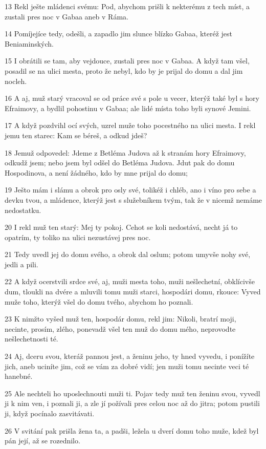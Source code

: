 \par 13 Rekl ješte mládenci svému: Pod, abychom prišli k nekterému z tech míst, a zustali pres noc v Gabaa aneb v Ráma.
\par 14 Pomíjejíce tedy, odešli, a zapadlo jim slunce blízko Gabaa, kteréž jest Beniaminských.
\par 15 I obrátili se tam, aby vejdouce, zustali pres noc v Gabaa. A když tam všel, posadil se na ulici mesta, proto že nebyl, kdo by je prijal do domu a dal jim nocleh.
\par 16 A aj, muž starý vracoval se od práce své s pole u vecer, kterýž také byl s hory Efraimovy, a bydlil pohostinu v Gabaa; ale lidé místa toho byli synové Jemini.
\par 17 A když pozdvihl ocí svých, uzrel muže toho pocestného na ulici mesta. I rekl jemu ten starec: Kam se béreš, a odkud jdeš?
\par 18 Jemuž odpovedel: Jdeme z Betléma Judova až k stranám hory Efraimovy, odkudž jsem; nebo jsem byl odšel do Betléma Judova. Jdut pak do domu Hospodinova, a není žádného, kdo by mne prijal do domu;
\par 19 Ješto mám i slámu a obrok pro osly své, tolikéž i chléb, ano i víno pro sebe a devku tvou, a mládence, kterýž jest s služebníkem tvým, tak že v nicemž nemáme nedostatku.
\par 20 I rekl muž ten starý: Mej ty pokoj. Cehot se koli nedostává, necht já to opatrím, ty toliko na ulici nezustávej pres noc.
\par 21 Tedy uvedl jej do domu svého, a obrok dal oslum; potom umyvše nohy své, jedli a pili.
\par 22 A když ocerstvili srdce své, aj, muži mesta toho, muži nešlechetní, obklícivše dum, tloukli na dvére a mluvili tomu muži starci, hospodári domu, rkouce: Vyved muže toho, kterýž všel do domu tvého, abychom ho poznali.
\par 23 K nimžto vyšed muž ten, hospodár domu, rekl jim: Nikoli, bratrí moji, necinte, prosím, zlého, ponevadž všel ten muž do domu mého, neprovodte nešlechetnosti té.
\par 24 Aj, dceru svou, kteráž pannou jest, a ženinu jeho, ty hned vyvedu, i ponížíte jich, aneb uciníte jim, což se vám za dobré vidí; jen muži tomu necinte veci té hanebné.
\par 25 Ale nechteli ho uposlechnouti muži ti. Pojav tedy muž ten ženinu svou, vyvedl ji k nim ven, i poznali ji, a zle jí požívali pres celou noc až do jitra; potom pustili ji, když pocínalo zasvitávati.
\par 26 V svitání pak prišla žena ta, a padši, ležela u dverí domu toho muže, kdež byl pán její, až se rozednilo.
